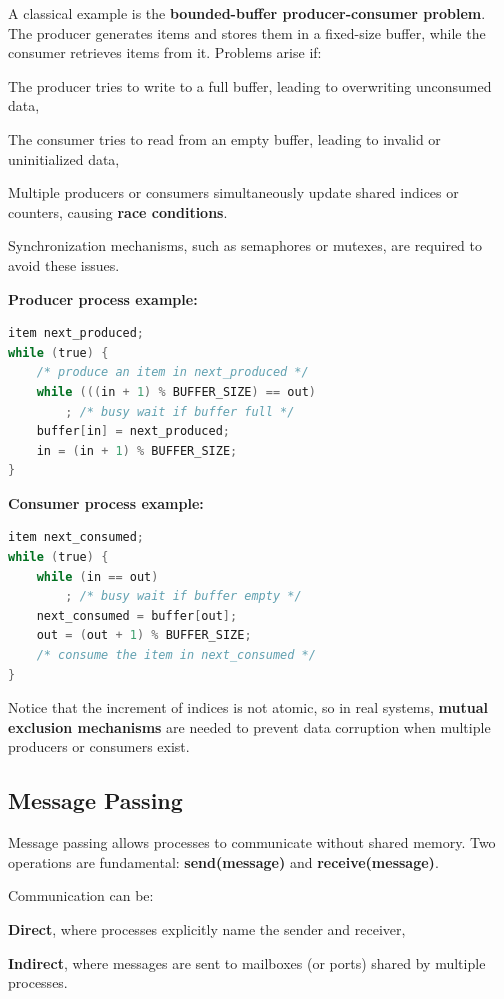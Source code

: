 A classical example is the \textbf{bounded-buffer producer-consumer problem}. The producer generates items and stores them in a fixed-size buffer, while the consumer retrieves items from it. Problems arise if:

\begin{compactitemize}
    \item The producer tries to write to a full buffer, leading to overwriting unconsumed data,  
    \item The consumer tries to read from an empty buffer, leading to invalid or uninitialized data,  
    \item Multiple producers or consumers simultaneously update shared indices or counters, causing \textbf{race conditions}.
\end{compactitemize}

Synchronization mechanisms, such as semaphores or mutexes, are required to avoid these issues.  

\textbf{Producer process example:}
\begin{lstlisting}[language=C]
item next_produced;
while (true) {
    /* produce an item in next_produced */
    while (((in + 1) % BUFFER_SIZE) == out)
        ; /* busy wait if buffer full */
    buffer[in] = next_produced;
    in = (in + 1) % BUFFER_SIZE;
}
\end{lstlisting}

\textbf{Consumer process example:}
\begin{lstlisting}[language=C]
item next_consumed;
while (true) {
    while (in == out)
        ; /* busy wait if buffer empty */
    next_consumed = buffer[out];
    out = (out + 1) % BUFFER_SIZE;
    /* consume the item in next_consumed */
}
\end{lstlisting}

Notice that the increment of indices is not atomic, so in real systems, \textbf{mutual exclusion mechanisms} are needed to prevent data corruption when multiple producers or consumers exist.

\subsection{Message Passing}

Message passing allows processes to communicate without shared memory. Two operations are fundamental: \textbf{send(message)} and \textbf{receive(message)}.  

Communication can be:

\begin{compactitemize}
    \item \textbf{Direct}, where processes explicitly name the sender and receiver,  
    \item \textbf{Indirect}, where messages are sent to mailboxes (or ports) shared by multiple processes.  
\end{compactitemize}

